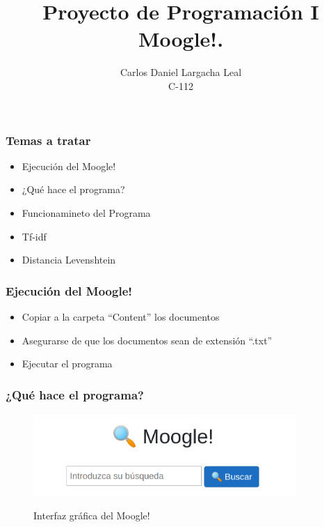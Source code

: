 \documentclass{beamer}
\title[Carlos Daniel Largacha Leal C-112]{Proyecto de Programación I \\ Moogle!.}
\author[Proyecto I Moogle!]{Carlos Daniel Largacha Leal \\ C-112}
\date{}
\begin{document}

\begin{frame}
		\frametitle{Temas a tratar} 
	\begin{itemize}
		\item  Ejecución del Moogle!
		\item  ¿Qué hace el programa?
		\item  Funcionamineto del Programa
		\item  Tf-idf
		\item  Distancia Levenshtein
	\end{itemize} 
\end{frame}

\begin{frame}
	\frametitle{Ejecución del Moogle!} 
	\begin{itemize}
    \item  Copiar a la carpeta “Content” los documentos
    \item  Asegurarse de que los documentos sean de extensión “.txt”
    \item  Ejecutar el programa
	\end{itemize} 
\end{frame}

\begin{frame}
	\frametitle{¿Qué hace el programa?} 
	\begin{figure}
		\includegraphics[width=10cm]{moogle.png}
		\label{Lupita}
		\caption{Interfaz gráfica del Moogle!}
    \end{figure}
\end{frame}	
\end{document}
